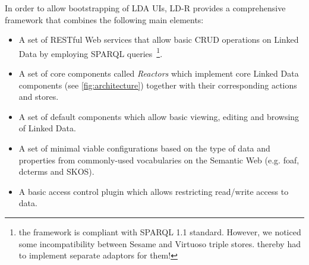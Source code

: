 \documentclass{acm_proc_article-sp}
\begin{document}
In order to allow bootstrapping of LDA UIs, LD-R provides a comprehensive framework that combines the following main elements:
\begin{itemize}

\item A set of RESTful Web services that allow basic CRUD operations on Linked Data by  employing SPARQL queries~\footnote{the framework is compliant with SPARQL 1.1 standard. However, we noticed some incompatibility between Sesame and Virtuoso triple stores. thereby had to implement separate adaptors for them!}.

\item A set of core components called \emph{Reactors} which implement core Linked Data components (see \autoref{fig:architecture}) together with their corresponding actions and stores.

\item A set of default components which allow basic viewing, editing and browsing of Linked Data.

\item A set of minimal viable configurations based on the type of data and properties from commonly-used vocabularies on the Semantic Web (e.g. foaf, dcterms and SKOS).

\item A basic access control plugin which allows restricting read/write access to data.

\end{itemize}

%

\end{document}

